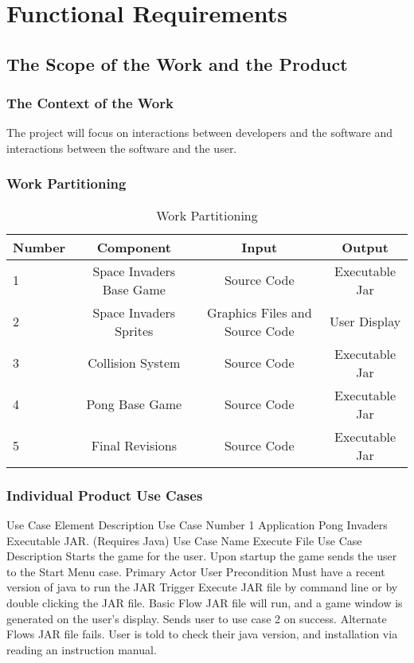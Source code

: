 \documentclass[12pt, titlepage]{article}
\begin{document}
\section{Functional Requirements}
\subsection{The Scope of the Work and the Product}
\subsubsection{The Context of the Work}
The project will focus on interactions between developers and the software and
interactions between the software and the user.

\subsubsection{Work Partitioning}
\begin{table}[h]
  \caption{Work Partitioning}
  \label{tab:table1}
  \begin{tabular}{|l|c | c |c|}
    \hline
    \textbf{Number} & \textbf{Component} & \textbf{Input} & \textbf{Output}\\
    \hline
   	 1 & Space Invaders Base Game & Source Code & \multicolumn{1}{c|}{ Executable Jar}\\
    \hline
	  2 & Space Invaders Sprites & Graphics Files and Source Code & \multicolumn{1}{c|}{ User Display}\\
    \hline
    	3 & Collision System & Source Code & \multicolumn{1}{c|}{ Executable Jar}\\
    \hline
	 4 & Pong Base Game & Source Code & \multicolumn{1}{c|}{ Executable Jar}\\
    \hline
 	5 & Final Revisions & Source Code & \multicolumn{1}{c|}{ Executable Jar}\\
    \hline
  \end{tabular}
\end{table}

\subsubsection{Individual Product Use Cases}

Use Case Element
Description
Use Case Number
1
Application
Pong Invaders Executable JAR. (Requires Java)
Use Case Name
Execute File
Use Case Description
Starts the game for the user. Upon startup the game sends the user to the Start
Menu case.
Primary Actor
User 
Precondition
Must have a recent version of java to run the JAR
Trigger
Execute JAR file by command line or by double clicking the JAR file.
Basic Flow
JAR file will run, and a game window is generated on the user’s display. Sends
user to use case 2 on success.
Alternate Flows
JAR file fails. User is told to check their java version, and installation via
reading an instruction manual.
\end{document}
